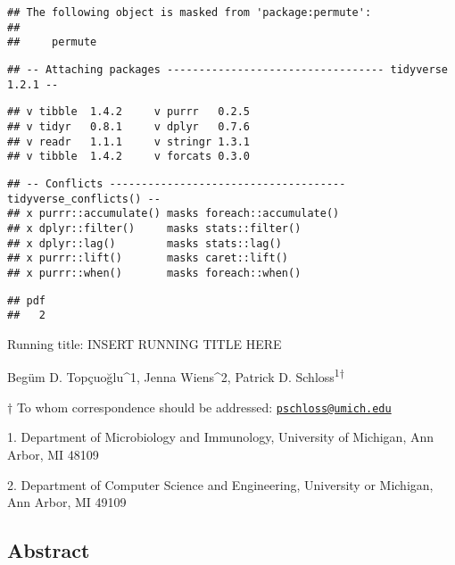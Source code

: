 \documentclass[11pt,]{article}
\begin{document}
\begin{verbatim}
## The following object is masked from 'package:permute':
## 
##     permute
\end{verbatim}

\begin{verbatim}
## -- Attaching packages ---------------------------------- tidyverse 1.2.1 --
\end{verbatim}

\begin{verbatim}
## v tibble  1.4.2     v purrr   0.2.5
## v tidyr   0.8.1     v dplyr   0.7.6
## v readr   1.1.1     v stringr 1.3.1
## v tibble  1.4.2     v forcats 0.3.0
\end{verbatim}

\begin{verbatim}
## -- Conflicts ------------------------------------- tidyverse_conflicts() --
## x purrr::accumulate() masks foreach::accumulate()
## x dplyr::filter()     masks stats::filter()
## x dplyr::lag()        masks stats::lag()
## x purrr::lift()       masks caret::lift()
## x purrr::when()       masks foreach::when()
\end{verbatim}

\begin{verbatim}
## pdf 
##   2
\end{verbatim}

\vspace{35mm}

Running title: INSERT RUNNING TITLE HERE

\vspace{35mm}

Begüm D. Topçuoğlu\^{}1, Jenna Wiens\^{}2, Patrick D.
Schloss\textsuperscript{1\(\dagger\)}

\vspace{40mm}

\(\dagger\) To whom correspondence should be addressed:
\href{mailto:pschloss@umich.edu}{\nolinkurl{pschloss@umich.edu}}

1. Department of Microbiology and Immunology, University of Michigan,
Ann Arbor, MI 48109

2. Department of Computer Science and Engineering, University or
Michigan, Ann Arbor, MI 49109

\newpage

\linenumbers

\subsection{Abstract}\label{abstract}
\end{document}
